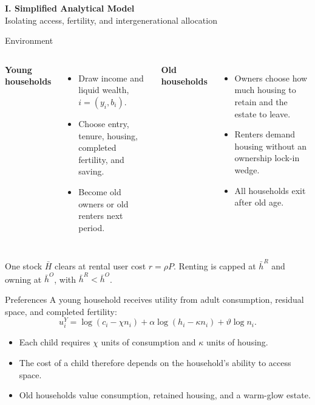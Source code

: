 \documentclass[aspectratio=169,11pt]{beamer}
\newcommand{\source}[1]{}
\newcommand{\tightitems}{\setlength{\itemsep}{0.55em}}
\newcommand{\1}{\mathbf 1}
\begin{document}
\begin{frame}
  \centering
  {\Large\textbf{I. Simplified Analytical Model}}\\[0.8em]
  {\normalsize Isolating access, fertility, and intergenerational allocation}
\end{frame}

\begin{frame}{Environment}
  \begin{columns}[T,onlytextwidth]
      \textbf{Young households}
      \begin{itemize}\tightitems
        \item Draw income and liquid wealth, $i=(y_i,b_i)$.
        \item Choose entry, tenure, housing, completed fertility, and saving.
        \item Become old owners or old renters next period.
      \end{itemize}
      \textbf{Old households}
      \begin{itemize}\tightitems
        \item Owners choose how much housing to retain and the estate to leave.
        \item Renters demand housing without an ownership lock-in wedge.
        \item All households exit after old age.
      \end{itemize}
  \end{columns}

  \vspace{0.6em}
  One stock $\bar H$ clears at rental user cost $r=\rho P$. Renting is capped at $\bar h^R$ and owning at $\bar h^O$, with $\bar h^R<\bar h^O$.
  \source{Circulated note, Analytical Model: Environment.}
\end{frame}

\begin{frame}{Preferences}
  \large
  A young household receives utility from adult consumption, residual space, and completed fertility:
  \[
    u_i^Y=\log(c_i-\chi n_i)
      +\alpha\log(h_i-\kappa n_i)
      +\vartheta\log n_i.
  \]

  \begin{itemize}\tightitems
    \item Each child requires $\chi$ units of consumption and $\kappa$ units of housing.
    \item The cost of a child therefore depends on the household's ability to access space.
    \item Old households value consumption, retained housing, and a warm-glow estate.
  \end{itemize}
  \source{Circulated note, Analytical Model: Households.}
\end{frame}
\end{document}
